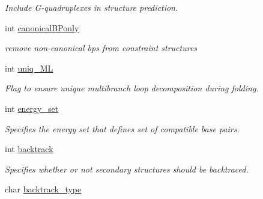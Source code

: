 \begin{DoxyCompactItemize}
\begin{DoxyCompactList}\small\item\em Include G-\/quadruplexes in structure prediction. \end{DoxyCompactList}\item 
int \hyperlink{group__model__details_a87edce006e9daff84363ec0e6abd2182}{canonical\+B\+Ponly}\hypertarget{group__model__details_a87edce006e9daff84363ec0e6abd2182}{}\label{group__model__details_a87edce006e9daff84363ec0e6abd2182}

\begin{DoxyCompactList}\small\item\em remove non-\/canonical bp\textquotesingle{}s from constraint structures \end{DoxyCompactList}\item 
int \hyperlink{group__model__details_ade065b814a4e2e72ead93ab502613ed2}{uniq\+\_\+\+ML}\hypertarget{group__model__details_ade065b814a4e2e72ead93ab502613ed2}{}\label{group__model__details_ade065b814a4e2e72ead93ab502613ed2}

\begin{DoxyCompactList}\small\item\em Flag to ensure unique multibranch loop decomposition during folding. \end{DoxyCompactList}\item 
int \hyperlink{group__model__details_a5eee4e3b468eb690d1407e0178dafb3f}{energy\+\_\+set}\hypertarget{group__model__details_a5eee4e3b468eb690d1407e0178dafb3f}{}\label{group__model__details_a5eee4e3b468eb690d1407e0178dafb3f}

\begin{DoxyCompactList}\small\item\em Specifies the energy set that defines set of compatible base pairs. \end{DoxyCompactList}\item 
int \hyperlink{group__model__details_a31f4471608cbdd03887f63c281823adb}{backtrack}\hypertarget{group__model__details_a31f4471608cbdd03887f63c281823adb}{}\label{group__model__details_a31f4471608cbdd03887f63c281823adb}

\begin{DoxyCompactList}\small\item\em Specifies whether or not secondary structures should be backtraced. \end{DoxyCompactList}\item 
char \hyperlink{group__model__details_abb265da25121d22ed11c8435861f0e53}{backtrack\+\_\+type}\hypertarget{group__model__details_abb265da25121d22ed11c8435861f0e53}{}\label{group__model__details_abb265da25121d22ed11c8435861f0e53}


\end{DoxyCompactItemize}
